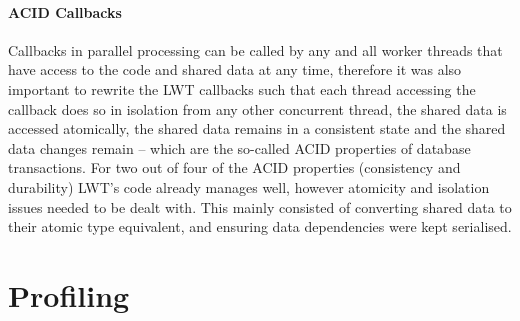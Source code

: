 \documentclass[12pt,twoside,notitlepage]{report}
\begin{document}
%
%
\paragraph{ACID Callbacks}
\label{para:acid_callbacks}
Callbacks in parallel processing can be called by any and all worker threads that have access to the code and shared data at any time, therefore it was also important to rewrite the LWT callbacks such that each thread accessing the
callback does so in isolation from any other concurrent thread, the shared data is accessed atomically, the shared data remains in a consistent state and the shared data changes remain -- which are the so-called ACID properties of
database transactions. For two out of four of the ACID properties (consistency and durability) LWT's code already manages well, however atomicity and isolation issues needed to be dealt with. This mainly consisted of converting shared
data to their atomic type equivalent, and ensuring data dependencies were kept serialised.

\section{Profiling}
\label{sec:profiling}
%
%

%
%

%
%
\end{document}
